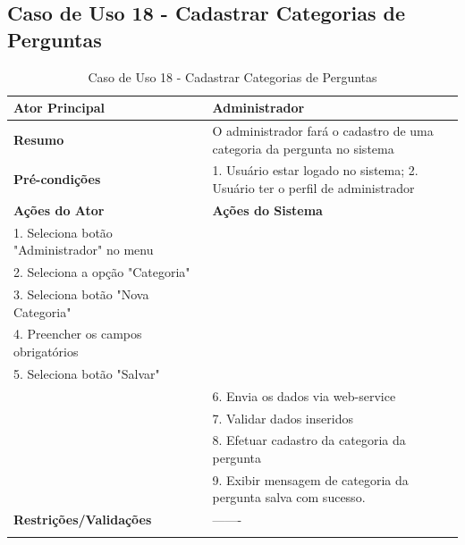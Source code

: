 \subsection{Caso de Uso 18 - Cadastrar Categorias de Perguntas}
\label{sc:case18}
\begin{center}
\begin{longtable}{p{8cm}|p{8cm}}
    \hline
    \textbf{Ator Principal} & Administrador \\
    \hline
    \textbf{Resumo} & O administrador fará o cadastro de uma categoria da pergunta no sistema \\
    \hline
    \textbf{Pr\'{e}-condi\c{c}\~{o}es} & 1. Usuário estar logado no sistema; 2. Usuário ter o perfil de administrador \\
    \hline
    \textbf{A\c{c}\~{o}es do Ator} & \textbf{A\c{c}\~{o}es do Sistema} \\
    \hline
    1. Seleciona botão "Administrador" no menu \\
    \hline
    2. Seleciona a opção "Categoria" \\
	\hline
    3. Seleciona botão "Nova Categoria" \\
	\hline
    4. Preencher os campos obrigatórios \\
	\hline
    5. Seleciona botão "Salvar" \\
    \hline
    & 6. Envia os dados via web-service \\
	\hline
    & 7. Validar dados inseridos \\
	\hline
    & 8. Efetuar cadastro da categoria da pergunta \\
	\hline
    & 9. Exibir mensagem de categoria da pergunta salva com sucesso. \\
    \hline
    \hline
    \textbf{Restri\c{c}\~{o}es/Valida\c{c}\~{o}es} & -------\\
\hline
\caption{Caso de Uso 18 - Cadastrar Categorias de Perguntas}
\end{longtable}
\end{center}

